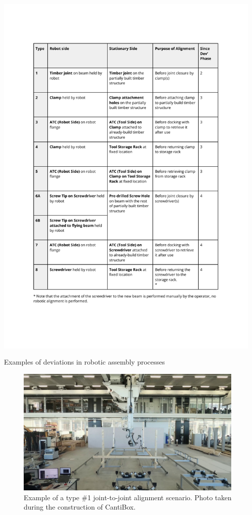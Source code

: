 \begin{table}[h!]
    \includegraphics[page=2, trim=25.4mm 135mm 25.4mm 33mm, clip, width=0.98\textwidth]{tables/Tables in Chapter 9 to 11.pdf}
    \caption{Examples of deviations in robotic assembly processes}
    \label{table:deviations_examples}
\end{table}

\FloatBarrier
\clearpage

\begin{figure}[h]
    \centering
    \includegraphics[width=0.99\textwidth]{images/09/Type one alignment scenario.jpg}
    \caption{Example of a type \#1 joint-to-joint alignment scenario. Photo taken during the construction of CantiBox.}
    \label{fig:type_one_alignment_example}
\end{figure}

